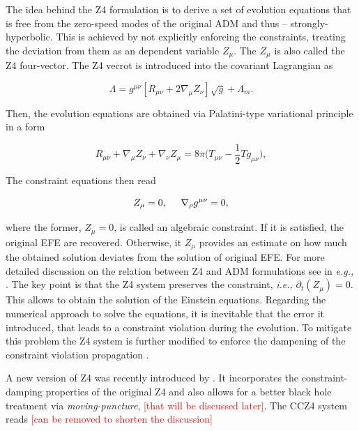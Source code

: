 \documentclass[11pt,a4paper,headinclude=true,DIV=14,BCOR=8mm,chapterprefix,listof=totoc,twoside,openright,abstracton]{scrbook}
\newcommand{\red}[1]{\textcolor{red}{#1}}
\begin{document}
The idea behind the Z4 formulation is to derive a set of evolution equations that is free from the zero-speed modes of the original ADM and thus -- strongly-hyperbolic. This is achieved by not explicitly enforcing the constraints, treating the deviation from them as an dependent variable $Z_{\mu}$. The $Z_{\mu}$ is also called the Z4 four-vector. The Z4 vecrot is introduced into the covariant Lagrangian as 

\begin{equation}
\Lambda = g^{\mu\nu}[R_{\mu\nu} + 2\nabla_{\mu}Z_{\nu}]\sqrt{g} + \Lambda_m.
\end{equation}

Then, the evolution equations are obtained via Palatini-type variational principle\cite{Bona:2010is} in a form

\begin{equation}
R_{\mu\nu} + \nabla_{\mu}Z_{\nu} + \nabla_{\nu}Z_{\mu}=8\pi\Big(T_{\mu\nu} - \frac{1}{2}Tg_{\mu\nu}\Big),
\label{eq:theory:z4fieldeq}
\end{equation}

The constraint equations then read 

\begin{equation}
Z_{\mu} = 0, \hspace{5mm}
\nabla_{\rho} g^{\mu\nu} = 0, 
\label{eq:theory:z4connect}
\end{equation}

where the former, $Z_{\mu} = 0$, is called an algebraic constraint. If it is satisfied, the original EFE are recovered. Otherwise, it $Z_{\mu}$ provides an estimate on how much the obtained solution deviates from the solution of original EFE. For more detailed discussion on the relation between Z4 and ADM formulations see in \textit{e.g.,} \cite{Bona:2009}. The key point is that the Z4 system preserves the constraint, \textit{i.e.,} $\partial_t (Z_{\mu})= 0$. This allows to obtain the solution of the Einstein equations. Regarding the numerical approach to solve the equations, it is inevitable that the error it introduced, that leads to a constraint violation during the evolution. To mitigate this problem the Z4 system is further modified to enforce the dampening of the constraint violation propagation \cite{Gundlach:2005eh}.

A new version of Z4 was recently introduced by \cite{Alic:2011gg}. It incorporates the constraint-damping properties of the original Z4 and also allows for a better black hole treatment via \textit{moving-puncture}, \red{[that will be discussed later]}. 
The CCZ4 system reads \red{[can be removed to shorten the discussion]}
\end{document}
